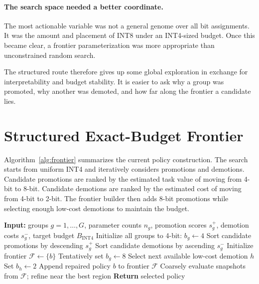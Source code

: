 \documentclass{article}
\begin{document}
\paragraph{The search space needed a better coordinate.}
The most actionable variable was not a general genome over all bit assignments. It was the amount and placement of INT8 under an INT4-sized budget. Once this became clear, a frontier parameterization was more appropriate than unconstrained random search.

The structured route therefore gives up some global exploration in exchange for interpretability and budget stability. It is easier to ask why a group was promoted, why another was demoted, and how far along the frontier a candidate lies.

\section{Structured Exact-Budget Frontier}

Algorithm~\ref{alg:frontier} summarizes the current policy construction. The search starts from uniform INT4 and iteratively considers promotions and demotions. Candidate promotions are ranked by the estimated task value of moving from 4-bit to 8-bit. Candidate demotions are ranked by the estimated cost of moving from 4-bit to 2-bit. The frontier builder then adds 8-bit promotions while selecting enough low-cost demotions to maintain the budget.

\begin{algorithm}[t]
\caption{Exact-budget 2/4/8 frontier construction}
\label{alg:frontier}
\begin{algorithmic}[1]
\STATE \textbf{Input:} groups $g=1,\dots,G$, parameter counts $n_g$, promotion scores $s^+_g$, demotion costs $s^-_g$, target budget $B_{\text{INT4}}$
\STATE Initialize all groups to 4-bit: $b_g \leftarrow 4$
\STATE Sort candidate promotions by descending $s^+_g$
\STATE Sort candidate demotions by ascending $s^-_g$
\STATE Initialize frontier $\mathcal{F} \leftarrow \{b\}$
    \STATE Tentatively set $b_g \leftarrow 8$
        \STATE Select next available low-cost demotion $h$
        \STATE Set $b_h \leftarrow 2$
    \ENDWHILE
    \STATE Append repaired policy $b$ to frontier $\mathcal{F}$
\ENDFOR
\STATE Coarsely evaluate snapshots from $\mathcal{F}$; refine near the best region
\STATE \textbf{Return} selected policy
\end{algorithmic}
\end{algorithm}
\end{document}
